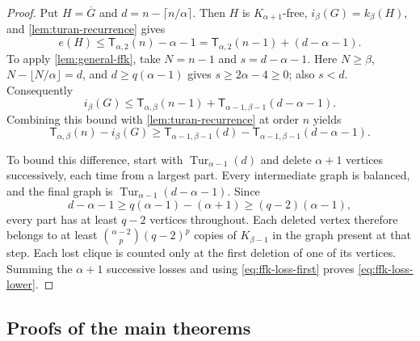 \documentclass[11pt]{article}
\theoremstyle{definition}
\newcommand{\Turan}{\operatorname{Tur}}
\newcommand{\turcl}[3]{\mathsf{T}_{#1,#2}(#3)}
\begin{document}
\begin{proof}
Put $H=\overline G$ and $d=n-\lceil n/\alpha\rceil$. Then $H$ is
$K_{\alpha+1}$-free, $i_\beta(G)=k_\beta(H)$, and
\cref{lem:turan-recurrence} gives
\[
 e(H)\le\turcl{\alpha}{2}{n}-\alpha-1
       =\turcl{\alpha}{2}{n-1}+(d-\alpha-1).
\]
To apply \cref{lem:general-ffk}, take $N=n-1$ and $s=d-\alpha-1$.
Here $N\ge\beta$, $N-\lfloor N/\alpha\rfloor=d$, and
$d\ge q(\alpha-1)$ gives $s\ge2\alpha-4\ge0$; also $s<d$.
Consequently
\[
 i_\beta(G)\le\turcl{\alpha}{\beta}{n-1}
                  +\turcl{\alpha-1}{\beta-1}{d-\alpha-1}.
\]
Combining this bound with \cref{lem:turan-recurrence} at order $n$
yields
\begin{equation}\label{eq:ffk-loss-first}
 \turcl{\alpha}{\beta}{n}-i_\beta(G)
 \ge\turcl{\alpha-1}{\beta-1}{d}
       -\turcl{\alpha-1}{\beta-1}{d-\alpha-1}.
\end{equation}

To bound this difference, start with $\Turan_{\alpha-1}(d)$ and
delete $\alpha+1$ vertices successively, each time from a largest
part. Every intermediate graph is balanced, and the final graph is
$\Turan_{\alpha-1}(d-\alpha-1)$. Since
\[
 d-\alpha-1\ge q(\alpha-1)-(\alpha+1)
             \ge(q-2)(\alpha-1),
\]
every part has at least $q-2$ vertices throughout. Each deleted
vertex therefore belongs to at least
$\binom{\alpha-2}{p}(q-2)^p$ copies of $K_{\beta-1}$ in the graph
present at that step. Each lost clique is counted only at the first
deletion of one of its vertices. Summing the $\alpha+1$ successive
losses and using \eqref{eq:ffk-loss-first} proves
\eqref{eq:ffk-loss-lower}.
\end{proof}


\subsection{Proofs of the main theorems}
\end{document}
